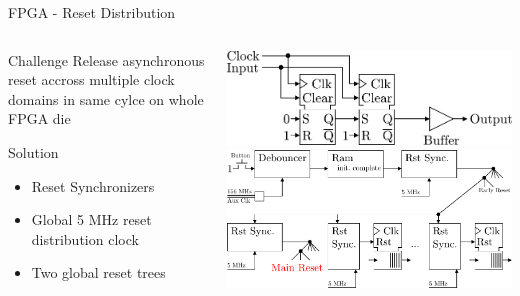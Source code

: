 \documentclass{beamer}
\begin{document}
\begin{frame}{FPGA - Reset Distribution}
  \begin{columns}[T]
    \begin{column}{.4\textwidth}
      \begin{block}{Challenge}
        Release asynchronous reset accross multiple
        clock domains in same cylce on whole FPGA die
      \end{block}

      \begin{block}{Solution}
        \begin{itemize}
        \item Reset Synchronizers
        \item Global 5 MHz reset distribution clock
        \item Two global reset trees
        \end{itemize}
      \end{block}
    \end{column}
    \begin{column}{.6\textwidth}
      \includegraphics[width=\textwidth]{figures/RstSync} \\
      \vspace{4ex}
      \includegraphics[width=\textwidth]{figures/rst_generation}
    \end{column}
  \end{columns}
\end{frame}
\end{document}
